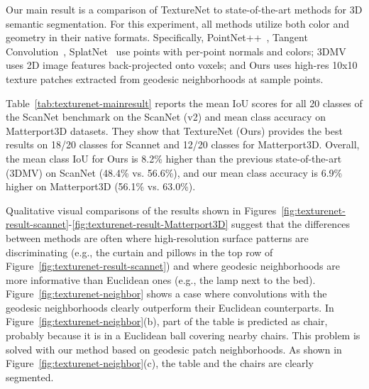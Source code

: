 Our main result is a comparison of TextureNet to state-of-the-art methods for 3D semantic segmentation.  For this experiment, all methods utilize both color and geometry in their native formats.   Specifically, PointNet++~\cite{qi2017pointnet++}, Tangent Convolution~\cite{tatarchenko2018tangent}, SplatNet~\cite{su2018splatnet} use points with per-point normals and colors; 3DMV~\cite{dai20183dmv} uses 2D image features back-projected onto voxels; and Ours uses high-res 10x10 texture patches extracted from geodesic neighborhoods at sample points.

Table~\ref{tab:texturenet-mainresult} reports the mean IoU scores for all 20 classes of the ScanNet benchmark on the ScanNet (v2) and mean class accuracy on Matterport3D datasets.   They show that TextureNet (Ours) provides the best results on 18/20 classes for Scannet and 12/20 classes for Matterport3D.  Overall, the mean class IoU for Ours is 8.2\% higher than the previous state-of-the-art (3DMV) on ScanNet (48.4\% vs. 56.6\%), and our mean class accuracy is 6.9\% higher on Matterport3D (56.1\% vs. 63.0\%).  

Qualitative visual comparisons of the results shown in Figures~\ref{fig:texturenet-result-scannet}-\ref{fig:texturenet-result-Matterport3D} suggest that the differences between methods are often where high-resolution surface patterns are discriminating (e.g., the curtain and pillows in the top row of Figure~\ref{fig:texturenet-result-scannet}) and where geodesic neighborhoods are more informative than Euclidean ones (e.g., the lamp next to the bed).  Figure~\ref{fig:texturenet-neighbor} shows a case where convolutions with the geodesic neighborhoods clearly outperform their Euclidean counterparts. In Figure~\ref{fig:texturenet-neighbor}(b), part of the table is predicted as chair, probably because it is in a Euclidean ball covering nearby chairs. This problem is solved with our method based on geodesic patch neighborhoods. As shown in Figure~\ref{fig:texturenet-neighbor}(c), the table and the chairs are clearly segmented.


